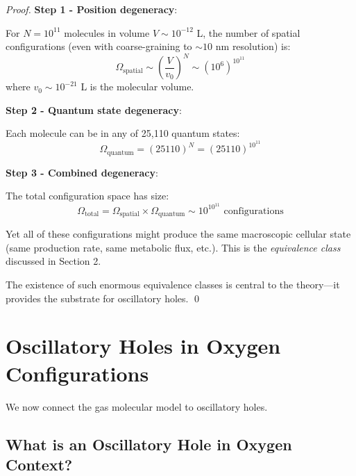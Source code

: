 \begin{proof}
\textbf{Step 1 - Position degeneracy}:

For $N = 10^{11}$ molecules in volume $V \sim 10^{-12}$ L, the number of spatial configurations (even with coarse-graining to $\sim 10$ nm resolution) is:
\begin{equation}
\Omega_{\text{spatial}} \sim \left(\frac{V}{v_0}\right)^N \sim (10^6)^{10^{11}}
\end{equation}
where $v_0 \sim 10^{-21}$ L is the molecular volume.

\textbf{Step 2 - Quantum state degeneracy}:

Each molecule can be in any of 25,110 quantum states:
\begin{equation}
\Omega_{\text{quantum}} = (25110)^{N} = (25110)^{10^{11}}
\end{equation}

\textbf{Step 3 - Combined degeneracy}:

The total configuration space has size:
\begin{equation}
\Omega_{\text{total}} = \Omega_{\text{spatial}} \times \Omega_{\text{quantum}} \sim 10^{10^{11}} \text{ configurations}
\end{equation}

Yet all of these configurations might produce the same macroscopic cellular state (same  production rate, same metabolic flux, etc.). This is the \textit{equivalence class} discussed in Section 2.

The existence of such enormous equivalence classes is central to the theory—it provides the substrate for oscillatory holes. \qed
\end{proof}

\section{Oscillatory Holes in Oxygen Configurations}

We now connect the gas molecular model to oscillatory holes.

\subsection{What is an Oscillatory Hole in Oxygen Context?}

